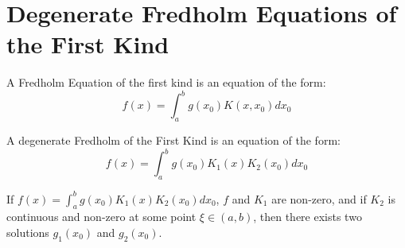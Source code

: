     \section{Degenerate Fredholm Equations of the First Kind}
        \begin{definition}
            A Fredholm Equation of the first kind is an equation
            of the form:
            \begin{equation*}
                f(x)=\int_{a}^{b}g(x_{0})K(x,x_{0})dx_{0}
            \end{equation*}
        \end{definition}
        \begin{definition}
            A degenerate Fredholm of the First Kind is an
            equation of the form:
                \begin{equation*}
                    f(x)=\int_{a}^{b}g(x_{0})K_{1}(x)
                         K_{2}(x_{0})dx_{0}
                \end{equation*}
        \end{definition}
        \begin{theorem}
            If $f(x)=\int_{a}^{b}g(x_{0})K_{1}(x)K_{2}(x_{0})
            dx_{0}$, $f$ and $K_1$ are non-zero,
            and if $K_{2}$ is continuous and non-zero
            at some point $\xi\in(a,b)$,
            then there exists two solutions $g_{1}(x_{0})$ and
            $g_{2}(x_{0})$.
        \end{theorem}

